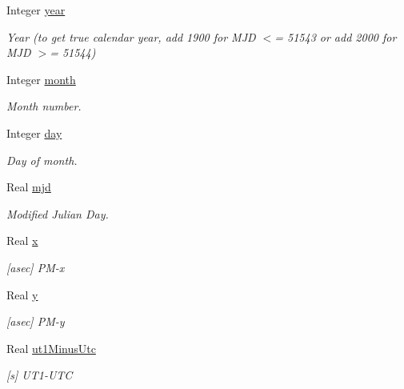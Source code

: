 \begin{DoxyCompactItemize}
\item 
Integer \hyperlink{structlibrary_1_1physics_1_1coord_1_1frame_1_1provider_1_1iers_1_1_bulletin_a_1_1_prediction_af246d98b5ff36e9c33c782a608de1d94}{year}
\begin{DoxyCompactList}\small\item\em Year (to get true calendar year, add 1900 for M\+JD $<$= 51543 or add 2000 for M\+JD $>$= 51544) \end{DoxyCompactList}\item 
Integer \hyperlink{structlibrary_1_1physics_1_1coord_1_1frame_1_1provider_1_1iers_1_1_bulletin_a_1_1_prediction_a3f21d863f34f2c747456e868a9309db4}{month}
\begin{DoxyCompactList}\small\item\em Month number. \end{DoxyCompactList}\item 
Integer \hyperlink{structlibrary_1_1physics_1_1coord_1_1frame_1_1provider_1_1iers_1_1_bulletin_a_1_1_prediction_a29d902fd9374f67d2662bd8e34195a9e}{day}
\begin{DoxyCompactList}\small\item\em Day of month. \end{DoxyCompactList}\item 
Real \hyperlink{structlibrary_1_1physics_1_1coord_1_1frame_1_1provider_1_1iers_1_1_bulletin_a_1_1_prediction_a5c5935219ea5943671b50edf5e3413b2}{mjd}
\begin{DoxyCompactList}\small\item\em Modified Julian Day. \end{DoxyCompactList}\item 
Real \hyperlink{structlibrary_1_1physics_1_1coord_1_1frame_1_1provider_1_1iers_1_1_bulletin_a_1_1_prediction_a38eed1e0f3a29d280e4eb2e9d2fa430b}{x}
\begin{DoxyCompactList}\small\item\em \mbox{[}asec\mbox{]} P\+M-\/x \end{DoxyCompactList}\item 
Real \hyperlink{structlibrary_1_1physics_1_1coord_1_1frame_1_1provider_1_1iers_1_1_bulletin_a_1_1_prediction_a69ca236230a4f7db7385c4f24d5ff2e0}{y}
\begin{DoxyCompactList}\small\item\em \mbox{[}asec\mbox{]} P\+M-\/y \end{DoxyCompactList}\item 
Real \hyperlink{structlibrary_1_1physics_1_1coord_1_1frame_1_1provider_1_1iers_1_1_bulletin_a_1_1_prediction_a476ef23f7e497b540180b40a824f6815}{ut1\+Minus\+Utc}
\begin{DoxyCompactList}\small\item\em \mbox{[}s\mbox{]} U\+T1-\/\+U\+TC \end{DoxyCompactList}\end{DoxyCompactItemize}


